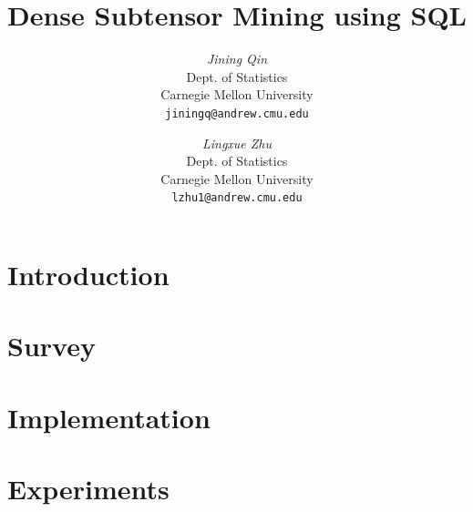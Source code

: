 \documentclass[12pt]{article}
\begin{document}
\newcommand{\beq}{\begin{equation}}
\newcommand{\eeq}{\end{equation}}
\newcommand{\bit}{\begin{itemize*}}
\newcommand{\eit}{\end{itemize*}}
\newcommand{\goal}[1]{ {\noindent {$\Rightarrow$} \em {#1} } }
\newcommand{\hide}[1]{}
\newcommand{\comment}[1]{ {\footnotesize {#1} } }
\newtheorem{lemma}{Lemma}
\newtheorem{theorem}{Theorem}
\newtheorem{proof}{Proof}
\newtheorem{defn}{Definition}
\newtheorem{algo}{Algorithm}
\newtheorem{observation}{Observation}

\title{Dense Subtensor Mining using SQL}


\author{ {\em Jining Qin} \\
	    Dept. of Statistics \\
	    Carnegie Mellon University\\
	    {\tt jiningq@andrew.cmu.edu}
	 \and
	 {\em Lingxue Zhu} \\
	     Dept. of Statistics \\
	    Carnegie Mellon University\\
	     {\tt lzhu1@andrew.cmu.edu}
        }


\maketitle

\section{Introduction}
   \label{sec:introduction} 
   

\section{Survey}
    \label{sec:survey}
    
    
    
\section{Implementation}
    \label{sec:implementation}
    

\section{Experiments}
    \label{sec:experiments}
    
    
\end{document}

